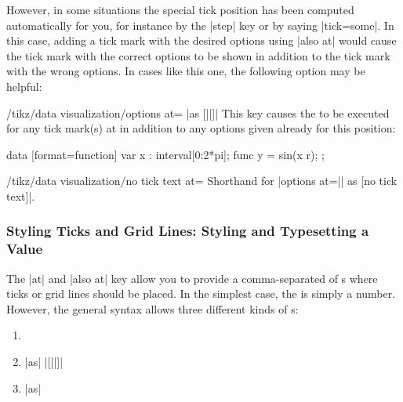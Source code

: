 However, in some situations the special tick position has been computed
automatically for you, for instance by the |step| key or by saying |tick=some|.
In this case, adding a tick mark with the desired options using |also at| would
cause the tick mark with the correct options to be shown in addition to the
tick mark with the wrong options. In cases like this one, the following option
may be helpful:

\begin{key}{/tikz/data visualization/options at= |as [||]|}
    This key causes the  to be executed for any tick mark(s) at
     in addition to any options given already for this position:
\begin{codeexample}[
    width=7cm,
    preamble={\usetikzlibrary{datavisualization.formats.functions}},
]
\tikz \datavisualization [
  scientific axes,
  visualize as smooth line,
  x axis={ticks={major={
    options at = 3    as [no tick text],
    also at    = (pi) as
      [{tick text padding=1ex}] $\pi$}}}]
data [format=function] {
  var x : interval[0:2*pi];
  func y = sin(\value x r);
};
\end{codeexample}
\end{key}

\begin{key}{/tikz/data visualization/no tick text at=}
    Shorthand for |options at=|| as [no tick text]|.
\end{key}


\subsubsection{Styling Ticks and Grid Lines: Styling and Typesetting a Value}
\label{section-dv-local-styles}
\label{section-dv-tick-labels}

The  |at| and |also at| key allow you to provide a
comma-separated  of s where ticks or grid lines should
be placed. In the simplest case, the  is simply a number. However,
the general syntax allows three different kinds of s:
%
\begin{enumerate}
    \item {}
    \item {} |as| |[||]|
    \item {} |as|  
\end{enumerate}

